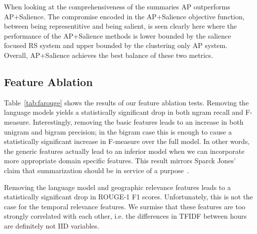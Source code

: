When looking at the comprehensiveness of the summaries AP outperforms
 AP+Salience. The compromise encoded in the AP+Salience objective
function, between being representitive and being salient, is seen clearly here
where the performance of the AP+Salience methods is lower bounded by 
the salience focused RS
system and upper bounded by the clustering only AP system.
Overall, AP+Salience achieves the best balance of these two metrics.



\subsection{Feature Ablation}


Table~\ref{tab:farouge} shows the results of our feature ablation
tests. Removing the language models yields a statistically 
significant drop in both ngram recall and F-measure. 
Interestingly, removing the basic features leads to an
increase in both unigram and bigram precision; in the bigram
case this is enough to cause a statistically significant increase
in F-measure over the full model. In other words, the generic features
actually lead to an inferior model when we can incorporate more appropriate
domain specific features.
This result mirrors Sparck Jones' claim that summarization should be in service of a purpose~\cite{?}.

Removing the language model and geographic relevance features leads to a
statistically significant drop in ROUGE-1 F1 scores. Unfortunately,
this is not the case for the temporal relevance features. We surmise that
these features are too strongly correlated with each other, 
i.e. the differences in TFIDF between hours are definitely not IID variables. 




